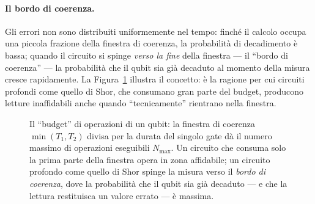 \paragraph{Il bordo di coerenza.}
Gli errori non sono distribuiti uniformemente nel tempo: finché il calcolo occupa una piccola frazione della finestra di coerenza, la probabilità di decadimento è bassa; quando il circuito si spinge \emph{verso la fine} della finestra --- il ``bordo di coerenza'' --- la probabilità che il qubit sia già decaduto al momento della misura cresce rapidamente. La Figura~\ref{fig:bordo_coerenza} illustra il concetto: è la ragione per cui circuiti profondi come quello di Shor, che consumano gran parte del budget, producono letture inaffidabili anche quando ``tecnicamente'' rientrano nella finestra.

\begin{figure}[H]
\centering
{}
\caption[Il bordo di coerenza: budget di operazioni e rischio di misura]{Il ``budget'' di operazioni di un qubit: la finestra di coerenza $\min(T_1, T_2)$ divisa per la durata del singolo gate dà il numero massimo di operazioni eseguibili $N_{\max}$. Un circuito che consuma solo la prima parte della finestra opera in zona affidabile; un circuito profondo come quello di Shor spinge la misura verso il \emph{bordo di coerenza}, dove la probabilità che il qubit sia già decaduto --- e che la lettura restituisca un valore errato --- è massima.}
\label{fig:bordo_coerenza}
\end{figure}

